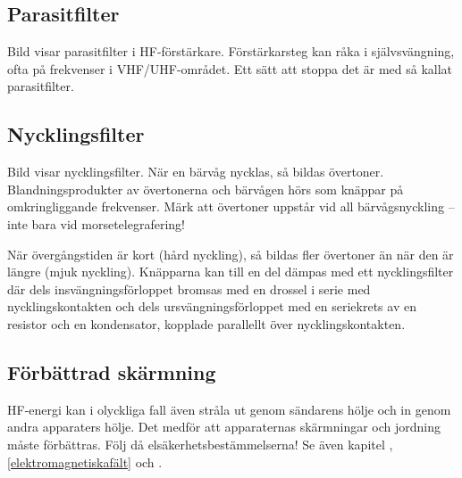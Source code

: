 \subsection{Parasitfilter}

Bild  visar parasitfilter i HF-förstärkare.
Förstärkarsteg kan råka i självsvängning, ofta på frekvenser i VHF/UHF-området.
Ett sätt att stoppa det är med så kallat parasitfilter.

\subsection{Nycklingsfilter}
\label{Nycklingsfilter}

Bild  visar nycklingsfilter.
När en bärvåg nycklas, så bildas övertoner.
Blandningsprodukter av övertonerna och bärvågen hörs som knäppar på
omkringliggande frekvenser.
Märk att övertoner uppstår vid all bärvågsnyckling -- inte bara vid
morsetelegrafering!

När övergångstiden är kort (hård nyckling), så bildas fler övertoner
än när den är längre (mjuk nyckling).
Knäpparna kan till en del dämpas med ett nycklingsfilter där dels
insvängningsförloppet bromsas med en drossel i serie med nycklingskontakten och
dels ursvängningsförloppet med en seriekrets av en resistor och en kondensator,
kopplade parallellt över nycklingskontakten.


\subsection{Förbättrad skärmning}

HF-energi kan i olyckliga fall även stråla ut genom sändarens hölje
och in genom andra apparaters hölje.
Det medför att apparaternas skärmningar och jordning måste förbättras.
Följ då elsäkerhetsbestämmelserna!
Se även kapitel , \ref{elektromagnetiskafält} och
.
